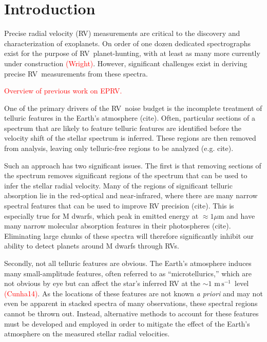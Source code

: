 \documentclass[twocolumn]{aastex62}
\newcommand{\unit}[1]{\mathrm{#1}}
\newcommand{\m}{\unit{m}}
\newcommand{\cm}{\unit{cm}}
\newcommand{\s}{\unit{s}}
\newcommand{\cms}{$\cm\,\s^{-1}$}
\newcommand{\ms}{$\m\,\s^{-1}$}
\newcommand{\todo}[1]{\textcolor{red}{#1}}  %
\newcommand{\acronym}[1]{{\small{#1}}}
\newcommand{\RV}{\acronym{RV}}
\newcommand{\EPRV}{\acronym{EPRV}}
\begin{document}
\section{Introduction}

Precise radial velocity (\RV) measurements are critical to the discovery and characterization of exoplanets. 
On order of one dozen dedicated spectrographs exist for the purpose of \RV\ planet-hunting, with at least as many more currently under construction \todo{(Wright)}. 
However, significant challenges exist in deriving precise \RV\ measurements from these spectra. 

\todo{Overview of previous work on \acronym{EPRV}.}

One of the primary drivers of the \RV\ noise budget is the incomplete treatment of telluric features in the
Earth's atmosphere (cite). 
Often, particular sections of a spectrum that are likely to feature telluric features are identified before the velocity shift of the stellar spectrum is inferred. 
These regions are then removed from analysis, leaving only telluric-free regions to be analyzed (e.g. cite).

Such an approach has two significant issues. 
The first is that removing sections of the spectrum removes significant regions of the spectrum that can be used to infer the stellar radial velocity. 
Many of the regions of significant telluric absorption lie in the red-optical and near-infrared, where there are many narrow spectral features that can be used to improve RV precision (cite).
This is especially true for M dwarfs, which peak in emitted energy at $\approx 1 \mu$m and have many narrow molecular absorption features in their photospheres (cite).
Eliminating large chunks of these spectra will therefore significantly inhibit our ability to detect planets around M dwarfs through RVs.

Secondly, not all telluric features are obvious. 
The Earth's atmosphere induces many small-amplitude features, often referred to as ``microtellurics,'' which are not obvious by eye but can affect the star's inferred RV at the $\sim 1$ \ms\ level \todo{(Cunha14)}. 
As the locations of these features are not known \textit{a priori} and may not even be apparent in stacked spectra of many observations, these spectral regions cannot be thrown out. 
Instead, alternative methods to account for these features must be developed and employed in order to mitigate the effect of the Earth's atmosphere on the measured stellar radial velocities.
\end{document}
